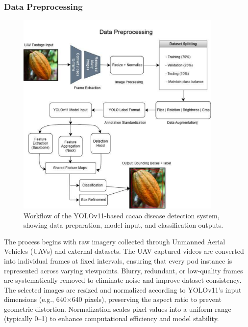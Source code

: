 \subsubsection*{Data Preprocessing}


\begin{figure}[H]
	\centering
	\caption{Workflow of the YOLOv11-based cacao disease detection system, showing data preparation, model input, and classification outputs.}
	\label{fig:Data Preprocessing Workflow}
	\includegraphics[width=0.9\textwidth]{figures/Data Processing.pdf}
\end{figure}

The process begins with raw imagery collected through Unmanned Aerial Vehicles (UAVs) and external datasets. The UAV-captured videos are converted into individual frames at fixed intervals, ensuring that every pod instance is represented across varying viewpoints. Blurry, redundant, or low-quality frames are systematically removed to eliminate noise and improve dataset consistency. The selected images are resized and normalized according to YOLOv11’s input dimensions (e.g., 640×640 pixels), preserving the aspect ratio to prevent geometric distortion. Normalization scales pixel values into a uniform range (typically 0–1) to enhance computational efficiency and model stability.

